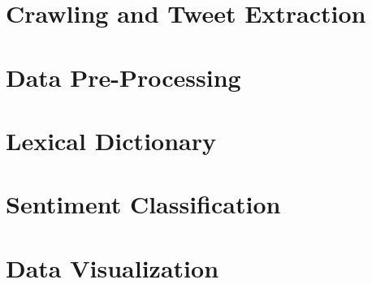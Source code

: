 \section{Crawling and Tweet Extraction}

\section{Data Pre-Processing}

\section{Lexical Dictionary}

\section{Sentiment Classification}

\section{Data Visualization}
    
